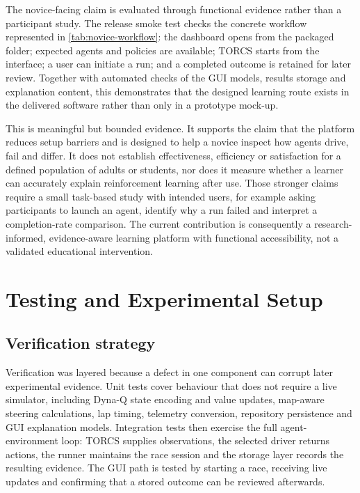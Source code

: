 The novice-facing claim is evaluated through functional evidence rather than a participant study. The release smoke test checks the concrete workflow represented in \cref{tab:novice-workflow}: the dashboard opens from the packaged folder; expected agents and policies are available; TORCS starts from the interface; a user can initiate a run; and a completed outcome is retained for later review. Together with automated checks of the GUI models, results storage and explanation content, this demonstrates that the designed learning route exists in the delivered software rather than only in a prototype mock-up.

This is meaningful but bounded evidence. It supports the claim that the platform reduces setup barriers and is designed to help a novice inspect how agents drive, fail and differ. It does not establish effectiveness, efficiency or satisfaction for a defined population of adults or students, nor does it measure whether a learner can accurately explain reinforcement learning after use. Those stronger claims require a small task-based study with intended users, for example asking participants to launch an agent, identify why a run failed and interpret a completion-rate comparison. The current contribution is consequently a research-informed, evidence-aware learning platform with functional accessibility, not a validated educational intervention.
\section{Testing and Experimental Setup}
\label{ch:testing}

\subsection{Verification strategy}

Verification was layered because a defect in one component can corrupt later experimental evidence. Unit tests cover behaviour that does not require a live simulator, including Dyna-Q state encoding and value updates, map-aware steering calculations, lap timing, telemetry conversion, repository persistence and GUI explanation models. Integration tests then exercise the full agent-environment loop: TORCS supplies observations, the selected driver returns actions, the runner maintains the race session and the storage layer records the resulting evidence. The GUI path is tested by starting a race, receiving live updates and confirming that a stored outcome can be reviewed afterwards.

